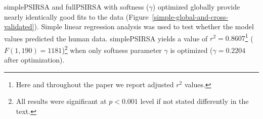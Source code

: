 \documentclass[11pt,a4paper]{article}
\begin{document}
simplePSIRSA and fullPSIRSA with softness ($\gamma$) optimized globally provide nearly identically good fits to the data  (Figure~\ref{simple-global-and-cross-validated}). Simple linear regression analysis was used to test whether the model values predicted the human data. 
simplePSIRSA yields a value of $r^2 = 0.8607$\footnote{Here and throughout the paper we report adjusted $r^2$ values.} ($F(1,190) = 1181$)\footnote{All results were significant at $p < 0.001$ level if not stated differently in the text.} when only softness parameter $\gamma$ is optimized ($\gamma=0.2204$ after optimization). 
\end{document}
